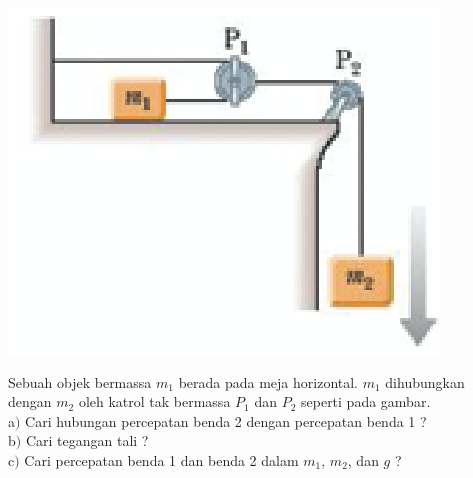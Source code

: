 \begin{center}
\includegraphics [scale=0.7]{latex/eps/1_5_1_image_1.eps}
\end{center}
Sebuah objek bermassa $m_{1}$ berada pada meja horizontal. $m_{1}$ dihubungkan dengan $m_{2}$ oleh katrol tak bermassa $P_{1}$ dan $P_{2}$ seperti pada gambar.\\
a$)$ Cari hubungan percepatan benda 2 dengan percepatan benda 1 ? \\
b$)$ Cari tegangan tali ?\\
c$)$ Cari percepatan benda 1 dan benda 2 dalam $m_{1}$, $m_{2}$, dan $g$ ?
